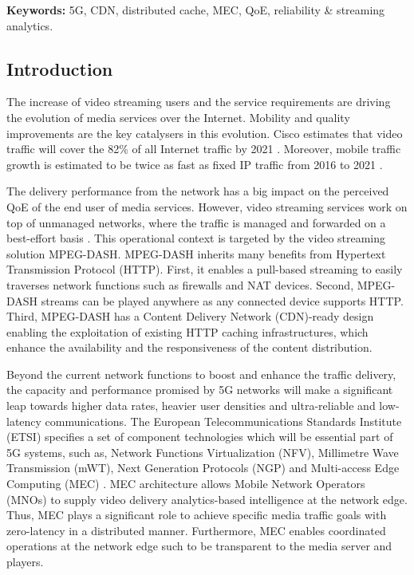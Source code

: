 \textbf{Keywords:} 5G, CDN, distributed cache, MEC, QoE, reliability \& streaming analytics.	
	
	
\subsection{Introduction}

The increase of video streaming users and the service requirements are driving the evolution of media services over the Internet. Mobility and quality improvements are the key catalysers in this evolution. Cisco estimates that video traffic will cover the 82\% of all Internet traffic by 2021 \cite{ciscovideo2016}. Moreover, mobile traffic growth is estimated to be twice as fast as fixed IP traffic from 2016 to 2021 \cite{ciscomobile2016}.

The delivery performance from the network has a big impact on the perceived QoE of the end user of media services. However, video streaming services work on top of unmanaged networks, where the traffic is managed and forwarded on a best-effort basis \cite{sodagar2011mpeg}. This operational context is targeted by the video streaming solution MPEG-DASH. MPEG-DASH inherits many benefits from Hypertext Transmission Protocol (HTTP). First, it enables a pull-based streaming \cite{begen2011} to easily traverses network functions such as firewalls and NAT devices. Second, MPEG-DASH streams can be played anywhere as any connected device supports HTTP. Third, MPEG-DASH has a Content Delivery Network (CDN)-ready design enabling the exploitation of existing HTTP caching infrastructures, which enhance the availability and the responsiveness of the content distribution.

Beyond the current network functions to boost and enhance the traffic delivery, the capacity and performance promised by 5G networks will make a significant leap towards higher data rates, heavier user densities and ultra-reliable and low-latency communications. The European Telecommunications Standards Institute (ETSI) specifies a set of component technologies which will be essential part of 5G systems, such as, Network Functions Virtualization (NFV), Millimetre Wave Transmission (mWT), Next Generation Protocols (NGP) and Multi-access Edge Computing (MEC) \cite{etsi2019}. MEC architecture allows Mobile Network Operators (MNOs) to supply video delivery analytics-based intelligence at the network edge. Thus, MEC plays a significant role to achieve specific media traffic goals with zero-latency in a distributed manner. Furthermore, MEC enables coordinated operations at the network edge such to be transparent to the media server and players.


